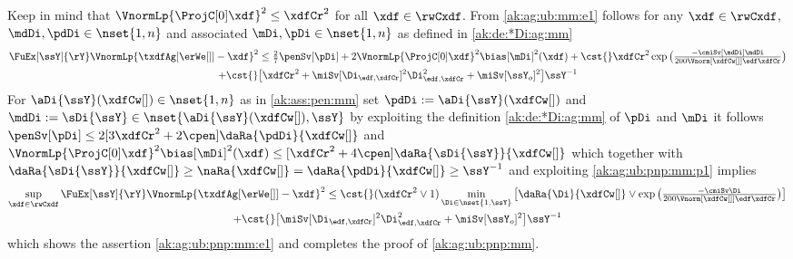 \begin{pro}Keep in mind that
  $\VnormLp{\ProjC[0]\xdf}^2\leq\xdfCr^2$ for all $\xdf\in\rwCxdf$.
From
\eqref{ak:ag:ub:mm:e1} follows for any $\xdf\in\rwCxdf$, $\mdDi,\pdDi\in\nset{1,n}$ and associated
$\mDi,\pDi\in\nset{1,n}$ as defined in  \eqref{ak:de:*Di:ag:mm}%
 \begin{multline}\label{ak:ag:ub:pnp:mm:p1}
    \FuEx[\ssY]{\rY}\VnormLp{\txdfAg[{\erWe[]}]-\xdf}^2\leq \tfrac{2}{7}\penSv[\pDi]
    +2\VnormLp{\ProjC[0]\xdf}^2\bias[\mDi]^2(\xdf)
 + \cst{}\xdfCr^2
 \exp\big(\tfrac{-\cmiSv[\mdDi]\mdDi}{200\Vnorm[{\xdfCw[]}]{\edf}\xdfCr}\big)%
\\ +\cst{}\big[%
 \xdfCr^2+\miSv[\Di_{\edf,\xdfCr}]^2\Di_{\edf,\xdfCr}^2+\miSv[\ssY_{o}]^2 \big]\ssY^{-1}%
\end{multline}
 For $\aDi{\ssY}(\xdfCw[])\in\nset{1,n}$
as in \ref{ak:ass:pen:mm}  set $\pdDi:=\aDi{\ssY}(\xdfCw[])$ and $\mdDi:=\sDi{\ssY}\in\nset{\aDi{\ssY}(\xdfCw[]),\ssY}$ by exploiting the definition
\eqref{ak:de:*Di:ag:mm} of $\pDi$ and $\mDi$ it follows
$\penSv[\pDi] \leq 2[3\xdfCr^2+ 2\cpen]
\daRa{\pdDi}{\xdfCw[]}$ and 
$\VnormLp{\ProjC[0]\xdf}^2\bias[\mDi]^2(\xdf)\leq
      [\xdfCr^2+4\cpen]\daRa{\sDi{\ssY}}{\xdfCw[]}$
which together with
$\daRa{\sDi{\ssY}}{\xdfCw[]}\geq\naRa{\xdfCw[]}=\daRa{\pdDi}{\xdfCw[]}\geq\ssY^{-1}$
and exploiting 
\eqref{ak:ag:ub:pnp:mm:p1} implies%
 \begin{multline}\label{ak:ag:ub:pnp:mm:p2}
   \sup_{\xdf\in\rwCxdf}\FuEx[\ssY]{\rY}\VnormLp{\txdfAg[{\erWe[]}]-\xdf}^2%
    \leq 
   \cst{}(\xdfCr^2\vee1)\min_{\Di\in\nset{1,\ssY}}\big[\daRa{\Di}{\xdfCw[]}\vee\exp\big(\tfrac{-\cmiSv\Di}{200\Vnorm[{\xdfCw[]}]{\edf}\xdfCr}\big)\big]\\
   +\cst{}\big[\miSv[\Di_{\edf,\xdfCr}]^2\Di_{\edf,\xdfCr}^2+\miSv[\ssY_{o}]^2 \big]\ssY^{-1}
\end{multline}
which shows the assertion \eqref{ak:ag:ub:pnp:mm:e1} and  completes the
proof of \cref{ak:ag:ub:pnp:mm}.\proEnd\end{pro}
